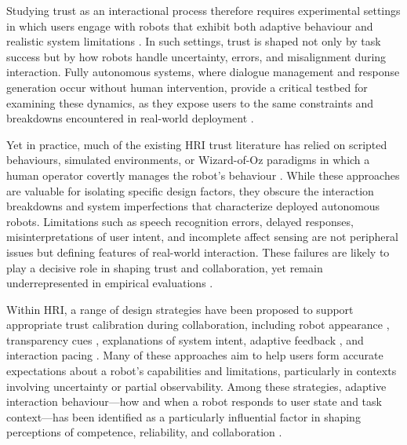 \documentclass[
]{article}
\begin{document}
Studying trust as an interactional process therefore requires
experimental settings in which users engage with robots that exhibit
both adaptive behaviour and realistic system limitations
\autocite{campagna2025}. In such settings, trust is shaped not only by
task success but by how robots handle uncertainty, errors, and
misalignment during interaction. Fully autonomous systems, where
dialogue management and response generation occur without human
intervention, provide a critical testbed for examining these dynamics,
as they expose users to the same constraints and breakdowns encountered
in real-world deployment \autocite{campagna2025}.

Yet in practice, much of the existing HRI trust literature has relied on
scripted behaviours, simulated environments, or Wizard-of-Oz paradigms
in which a human operator covertly manages the robot's behaviour
\autocite{bettencourt2025,campagna2025}. While these approaches are
valuable for isolating specific design factors, they obscure the
interaction breakdowns and system imperfections that characterize
deployed autonomous robots. Limitations such as speech recognition
errors, delayed responses, misinterpretations of user intent, and
incomplete affect sensing are not peripheral issues but defining
features of real-world interaction. These failures are likely to play a
decisive role in shaping trust and collaboration, yet remain
underrepresented in empirical evaluations \autocite{campagna2025}.

Within HRI, a range of design strategies have been proposed to support
appropriate trust calibration during collaboration, including robot
appearance \autocite{nicolas2021}, transparency cues
\autocite{zhang2019}, explanations of system intent, adaptive feedback
\autocite{val-calvo2020}, and interaction pacing \autocite{kok2020}.
Many of these approaches aim to help users form accurate expectations
about a robot's capabilities and limitations, particularly in contexts
involving uncertainty or partial observability. Among these strategies,
adaptive interaction behaviour---how and when a robot responds to user
state and task context---has been identified as a particularly
influential factor in shaping perceptions of competence, reliability,
and collaboration \autocite{fartook2025}.
\end{document}
